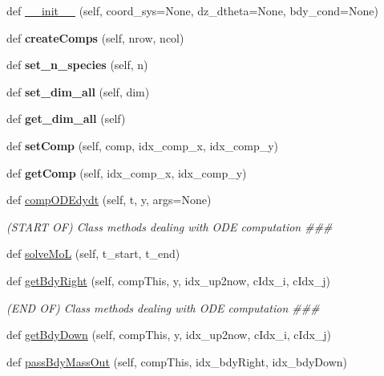\begin{DoxyCompactItemize}
\item 
def \hyperlink{classskin_1_1Skin_ae8c14fb876f2b90c955f4914df5ecde4}{\+\_\+\+\_\+init\+\_\+\+\_\+} (self, coord\+\_\+sys=None, dz\+\_\+dtheta=None, bdy\+\_\+cond=None)
\item 
def {\bfseries create\+Comps} (self, nrow, ncol)\hypertarget{classskin_1_1Skin_a0c3313324a2daa4875fba0ee9936c834}{}\label{classskin_1_1Skin_a0c3313324a2daa4875fba0ee9936c834}

\item 
def {\bfseries set\+\_\+n\+\_\+species} (self, n)\hypertarget{classskin_1_1Skin_ad565c3c4273e613be1be695124c6b0c6}{}\label{classskin_1_1Skin_ad565c3c4273e613be1be695124c6b0c6}

\item 
def {\bfseries set\+\_\+dim\+\_\+all} (self, dim)\hypertarget{classskin_1_1Skin_ab0e44ea0d793715a98df2be78d4b0bba}{}\label{classskin_1_1Skin_ab0e44ea0d793715a98df2be78d4b0bba}

\item 
def {\bfseries get\+\_\+dim\+\_\+all} (self)\hypertarget{classskin_1_1Skin_abfb289ef01f5524d660b4c9e34d96751}{}\label{classskin_1_1Skin_abfb289ef01f5524d660b4c9e34d96751}

\item 
def {\bfseries set\+Comp} (self, comp, idx\+\_\+comp\+\_\+x, idx\+\_\+comp\+\_\+y)\hypertarget{classskin_1_1Skin_a147823571847b0940eb4979c78e33e94}{}\label{classskin_1_1Skin_a147823571847b0940eb4979c78e33e94}

\item 
def {\bfseries get\+Comp} (self, idx\+\_\+comp\+\_\+x, idx\+\_\+comp\+\_\+y)\hypertarget{classskin_1_1Skin_a76771687f0225d9b7163d15583888515}{}\label{classskin_1_1Skin_a76771687f0225d9b7163d15583888515}

\item 
def \hyperlink{classskin_1_1Skin_ade7bc5930f22acb44e4cd34258afb4c0}{comp\+O\+D\+Edydt} (self, t, y, args=None)
\begin{DoxyCompactList}\small\item\em (S\+T\+A\+RT OF) Class methods dealing with O\+DE computation \#\#\# \end{DoxyCompactList}\item 
def \hyperlink{classskin_1_1Skin_aefaa68f4f0d659f05aa2babeafbe1995}{solve\+MoL} (self, t\+\_\+start, t\+\_\+end)
\item 
def \hyperlink{classskin_1_1Skin_a411a39ab1c8faf9faa3fb6c8bea777f9}{get\+Bdy\+Right} (self, comp\+This, y, idx\+\_\+up2now, c\+Idx\+\_\+i, c\+Idx\+\_\+j)
\begin{DoxyCompactList}\small\item\em (E\+ND OF) Class methods dealing with O\+DE computation \#\#\# \end{DoxyCompactList}\item 
def \hyperlink{classskin_1_1Skin_a477a800e6beba99197c2744ebcdc5426}{get\+Bdy\+Down} (self, comp\+This, y, idx\+\_\+up2now, c\+Idx\+\_\+i, c\+Idx\+\_\+j)
\item 
def \hyperlink{classskin_1_1Skin_acaf230b15ecaac97396c3e598cf786c6}{pass\+Bdy\+Mass\+Out} (self, comp\+This, idx\+\_\+bdy\+Right, idx\+\_\+bdy\+Down)
\end{DoxyCompactItemize}
